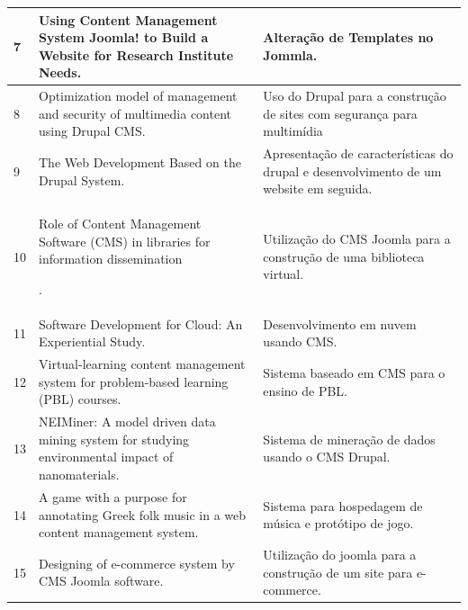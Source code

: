 \begin{apendicesenv}
\begin{landscape}
\begin{longtable}{|p{10pt}|p{320pt}|p{315pt}|}
 	\hline
 	{\raggedright 7}
 	 & {\raggedright Using {Content} {Management} {System} {Joomla}! to {Build} a {Website} for {Research} {Institute} {Needs}.}
 	 & {\raggedright Alteração de Templates no Jommla.\cite{Xiang2010}} \\
 	\hline
 		{\raggedright 8}
 	 	 & {\raggedright Optimization model of management and security of multimedia content using {Drupal} {CMS}.}
 	 	 & {\raggedright Uso do Drupal para a construção de sites com segurança para multimídia \cite{Ennert2012}} \\
 	 	\hline
 	 	
 		{\raggedright 9}
 	 	 & {\raggedright The {Web} {Development} {Based} on the {Drupal} {System}.}
 	 	 & {\raggedright Apresentação de características do drupal e desenvolvimento de um website em seguida.\cite{Cheng2012}} \\
 	 	\hline
 	 	
 	 		{\raggedright 10}
 	 	 	 & {\raggedright Role of {Content} {Management} {Software} ({CMS}) in libraries for information dissemination}.
 	 	 	 & {\raggedright Utilização do CMS Joomla para a construção de uma biblioteca virtual.\cite{Patnaik2015}} \\
 	 	 	\hline
 	 	 	
 	 	 		{\raggedright 11}
 	 	 	 	 & {\raggedright Software {Development} for {Cloud}: {An} {Experiential} {Study}.}
 	 	 	 	 & {\raggedright Desenvolvimento em nuvem usando CMS.\cite{Marimuthu2013}} \\
 	 	 	 	\hline
	{\raggedright 12}
 	 & {\raggedright Virtual-learning content management system for problem-based learning ({PBL}) courses.}
 	 & {\raggedright Sistema baseado em CMS para o ensino de PBL.\cite{AbuKasim2012}} \\
 	\hline
 	
 		{\raggedright 13}
 	 	 & {\raggedright {NEIMiner}: {A} model driven data mining system for studying environmental impact of nanomaterials.}
 	 	 & {\raggedright Sistema de mineração de dados usando o CMS Drupal.\cite{Tang2012}} \\
 	 	\hline
 	 	
 	 	{\raggedright 14}
 	 	 	 	 & {\raggedright A game with a purpose for annotating {Greek} folk music in a web content management system.}
 	 	 	 	 & {\raggedright Sistema para hospedagem de música e protótipo de jogo.\cite{Giouvanakis2013}} \\
 	 	 	 	\hline
 	 	 	 	
 	 	 	 	
 	 	 {\raggedright 15}
 	 	  	 	 & {\raggedright Designing of e-commerce system by {CMS} {Joomla} software.}
 	 	  	 	 & {\raggedright Utilização do joomla para a construção de um site para e-commerce.\cite{Dorosh2009}} \\
 	 	  	 	\hline
 	 	  	 	

\end{longtable}
\end{landscape}
\end{apendicesenv}
